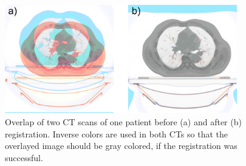 \documentclass[type=dr, dr=rernat, accentcolor=tud7b,colorbacktitle, bigchapter, openright, twoside, 12pt ]{tudthesis}
\begin{document}
\begin{figure}[H]
\begin{center}
\includegraphics[width=0.9\textwidth]{./Images/RegistrationCompare.png}
\caption{Overlap of two CT scans of one patient before (a) and after (b) registration. Inverse colors are used in both CTs so that the overlayed image should be gray colored,
if the registration was successful.}
\label{RegistrationCompare}
\end{center}
\end{figure}


{}
% 
\end{document}
